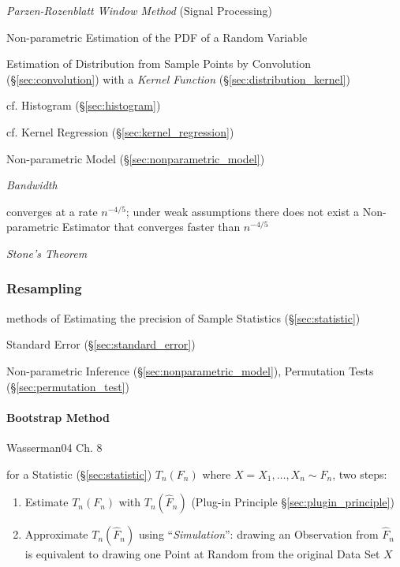 \emph{Parzen-Rozenblatt Window Method} (Signal Processing)

Non-parametric Estimation of the PDF of a Random Variable

Estimation of Distribution from Sample Points by Convolution
(\S\ref{sec:convolution}) with a \emph{Kernel Function}
(\S\ref{sec:distribution_kernel})

cf. Histogram (\S\ref{sec:histogram})

cf. Kernel Regression (\S\ref{sec:kernel_regression})

Non-parametric Model (\S\ref{sec:nonparametric_model})

\emph{Bandwidth}

converges at a rate $n^{-4/5}$;
under weak assumptions there does not exist a Non-parametric Estimator that
converges faster than $n^{-4/5}$

\emph{Stone's Theorem}



\subsubsection{Resampling}\label{sec:resampling}

methods of Estimating the precision of Sample Statistics (\S\ref{sec:statistic})

\fist Standard Error (\S\ref{sec:standard_error})

Non-parametric Inference (\S\ref{sec:nonparametric_model}), Permutation Tests
(\S\ref{sec:permutation_test})



\paragraph{Bootstrap Method}\label{sec:bootstrap_method}\hfill

Wasserman04 Ch. 8

for a Statistic (\S\ref{sec:statistic}) $T_n(F_n)$ where
$X = X_1, \ldots, X_n \sim F_n$, two steps:
\begin{enumerate}
  \item Estimate $T_n(F_n)$ with $T_n(\hat{F}_n)$ (Plug-in Principle
    \S\ref{sec:plugin_principle})
  \item Approximate $T_n(\hat{F}_n)$ using ``\emph{Simulation}'': drawing an
    Observation from $\hat{F}_n$ is equivalent to drawing one Point at Random
    from the original Data Set $X$
\end{enumerate}

